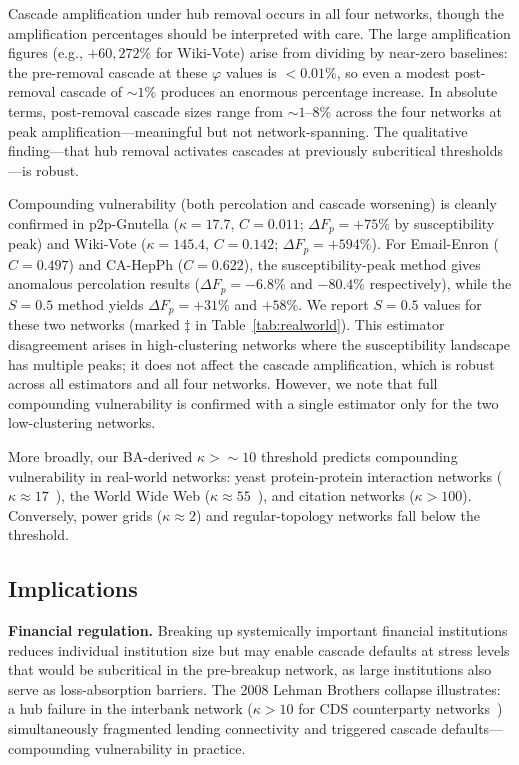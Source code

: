 \documentclass[aps,pre,twocolumn,superscriptaddress,showpacs]{revtex4-2}
\newcommand{\DF}{\Delta F}
\begin{document}
Cascade amplification under hub removal occurs in all four networks, though the amplification percentages should be interpreted with care. The large amplification figures (e.g., $+60{,}272\%$ for Wiki-Vote) arise from dividing by near-zero baselines: the pre-removal cascade at these $\varphi$ values is $<0.01\%$, so even a modest post-removal cascade of ${\sim}1\%$ produces an enormous percentage increase. In absolute terms, post-removal cascade sizes range from ${\sim}1$--$8\%$ across the four networks at peak amplification---meaningful but not network-spanning. The qualitative finding---that hub removal activates cascades at previously subcritical thresholds---is robust.

Compounding vulnerability (both percolation and cascade worsening) is cleanly confirmed in p2p-Gnutella ($\kappa=17.7$, $C=0.011$; $\DF_p=+75\%$ by susceptibility peak) and Wiki-Vote ($\kappa=145.4$, $C=0.142$; $\DF_p=+594\%$). For Email-Enron ($C=0.497$) and CA-HepPh ($C=0.622$), the susceptibility-peak method gives anomalous percolation results ($\DF_p=-6.8\%$ and $-80.4\%$ respectively), while the $S=0.5$ method yields $\DF_p=+31\%$ and $+58\%$. We report $S=0.5$ values for these two networks (marked $\ddag$ in Table~\ref{tab:realworld}). This estimator disagreement arises in high-clustering networks where the susceptibility landscape has multiple peaks; it does not affect the cascade amplification, which is robust across all estimators and all four networks. However, we note that full compounding vulnerability is confirmed with a single estimator only for the two low-clustering networks.

More broadly, our BA-derived $\kappa > {\sim}10$ threshold predicts compounding vulnerability in real-world networks: yeast protein-protein interaction networks ($\kappa \approx 17$~\cite{Jeong2001}), the World Wide Web ($\kappa \approx 55$~\cite{Albert1999}), and citation networks ($\kappa > 100$). Conversely, power grids ($\kappa \approx 2$) and regular-topology networks fall below the threshold.

\subsection{Implications}
\label{sec:implications}

\textbf{Financial regulation.} Breaking up systemically important financial institutions reduces individual institution size but may enable cascade defaults at stress levels that would be subcritical in the pre-breakup network, as large institutions also serve as loss-absorption barriers. The 2008 Lehman Brothers collapse illustrates: a hub failure in the interbank network ($\kappa > 10$ for CDS counterparty networks~\cite{Battiston2012,Haldane2011}) simultaneously fragmented lending connectivity and triggered cascade defaults---compounding vulnerability in practice.
\end{document}

